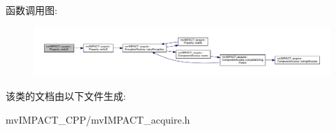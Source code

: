 函数调用图\+:
\nopagebreak
\begin{figure}[H]
\begin{center}
\leavevmode
\includegraphics[width=350pt]{classmv_i_m_p_a_c_t_1_1acquire_1_1_property_a49c7ecf0cf3198e9b29e1db1c99a2b2b_cgraph}
\end{center}
\end{figure}




该类的文档由以下文件生成\+:\begin{DoxyCompactItemize}
\item 
mv\+I\+M\+P\+A\+C\+T\+\_\+\+C\+P\+P/mv\+I\+M\+P\+A\+C\+T\+\_\+acquire.\+h\end{DoxyCompactItemize}
